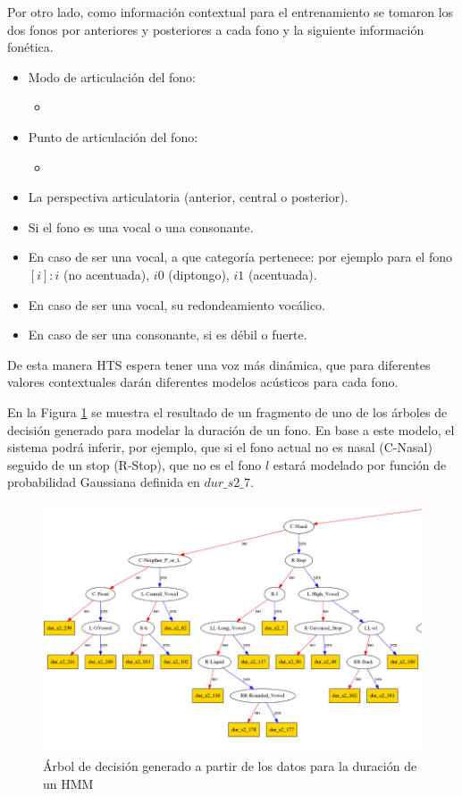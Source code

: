 Por otro lado, como información contextual para el entrenamiento se tomaron los dos fonos por anteriores y posteriores a cada fono y la siguiente información fonética.

\begin{itemize}
\item Modo de articulación del fono:
\begin{itemize}
	\item \TODO
\end{itemize}
\item Punto de articulación del fono:
\begin{itemize}
	\item \TODO
\end{itemize}
\item La perspectiva articulatoria (anterior, central o posterior).
\item Si el fono es una vocal o una consonante.
\item En caso de ser una vocal, a que categoría pertenece: por ejemplo para el fono $[i]:${$i$ (no acentuada), $i0$ (diptongo), $i1$ (acentuada)}.
\item En caso de ser una vocal, su redondeamiento vocálico.
\item En caso de ser una consonante, si es débil o fuerte.
\end{itemize}

De esta manera HTS espera tener una voz más dinámica, que para diferentes valores contextuales darán diferentes modelos acústicos para cada fono.

En la Figura \ref{genTree} se muestra el resultado de un fragmento de uno de los árboles de decisión generado para modelar la duración de un fono. En base a este modelo, el sistema podrá inferir, por ejemplo, que si el fono actual no es nasal (C-Nasal) seguido de un stop (R-Stop), que no es el fono $l$ estará modelado por función de probabilidad Gaussiana definida en $dur\_s2\_7$.

\begin{figure}
\begin{center}
\includegraphics[scale=0.4]{imagenes/arbolDeDesicionTesis.png}
\caption{Árbol de decisión generado a partir de los datos para la duración de un HMM}
\label{genTree}
\end{center}
\end{figure}

